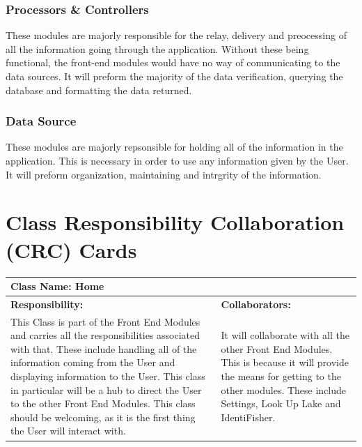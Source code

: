 \documentclass[]{article}
\begin{document}
\subsubsection{Processors \& Controllers}
These modules are majorly responsible for the relay, delivery and preocessing of all the information going through the application. Without these being functional, the front-end modules would have no way of communicating to the data sources. It will preform the majority of the data verification, querying the database and formatting the data returned.
\subsubsection{Data Source}
These modules are majorly repsonsible for holding all of the information in the application. This is necessary in order to use any information given by the User. It will preform organization, maintaining and intrgrity of the information.

\newpage
\section{Class Responsibility Collaboration (CRC) Cards}
\label{sec:class_responsibility_collaboration_crc_cards}

	\begin{table}[ht]
		\centering
		\begin{tabular}{|p{5cm}|p{5cm}|}
		\hline
		 \multicolumn{2}{|l|}{\textbf{Class Name: Home}} \\
		\hline
		\textbf{Responsibility:} & \textbf{Collaborators:} \\ \hline
		 This Class is part of the Front End Modules and carries all the responsibilities associated with that. These include handling all of the information coming from the User and displaying information to the User. This class in particular will be a hub to direct the User to the other Front End Modules. This class should be welcoming, as it is the first thing the User will interact with.& It will collaborate with all the other Front End Modules. This is because it will provide the means for getting to the other modules. These include Settings, Look Up Lake and IdentiFisher. \\
		\hline
		\end{tabular}
	\end{table}~\\
\end{document}

